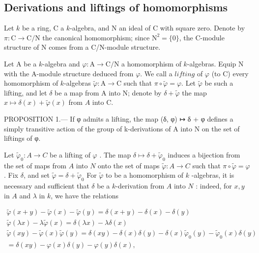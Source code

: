\subsection{Derivations and liftings of homomorphisms}

Let \(k\) be a ring, C a \(k\)-algebra, and N an ideal of C with square zero. Denote by \(\pi : \mathrm{C} \to \mathrm{C/N}\) the canonical homomorphism; since \(\mathrm{N}^2 = \{0\}\), the C-module structure of N comes from a C/N-module structure.

Let A be a \(k\)-algebra and \(\varphi : \mathrm{A} \to \mathrm{C/N}\) a homomorphism of \(k\)-algebras. Equip N with the A-module structure deduced from \(\varphi\). We call a \(lifting\) of \(\varphi\) (to C) every homomorphism of \(k\)-algebras \(\tilde{\varphi} : \mathrm{A} \to \mathrm{C}\) such that \(\pi \circ \tilde{\varphi} = \varphi\). Let \(\tilde{\varphi}\) be such a lifting, and let \(\delta\) be a map from A into N; denote by \(\delta + \tilde{\varphi}\) the map \(x \mapsto \delta(x) + \tilde{\varphi}(x)\) from \(A\) into C.

PROPOSITION 1.--- If φ admits a lifting, the map (δ, φ) ↦ δ + φ defines a simply transitive action of the group of k-derivations of A into N on the set of liftings of φ.

Let \(\tilde{\varphi}_{0}: A \to C\) be a lifting of \(\varphi\) . The map \(\delta \mapsto \delta + \tilde{\varphi}_{0}\) induces a bijection from the set of maps from \(A\) into \(N\) onto the set of maps \(\tilde{\varphi}: A \to C\) such that \(\pi \circ \tilde{\varphi} = \varphi\) . Fix \(\delta\), and set \(\tilde{\varphi} = \delta + \tilde{\varphi}_{0}\) For \(\tilde{\varphi}\) to be a homomorphism of \(k\) -algebras, it is necessary and sufficient that \(\delta\) be a \(k\)-derivation from \(A\) into \(N\) : indeed, for \(x, y\) in \(A\) and \(\lambda\) in \(k\), we have the relations

\[
\begin{array}{c} \tilde {\varphi} (x + y) - \tilde {\varphi} (x) - \tilde {\varphi} (y) = \delta (x + y) - \delta (x) - \delta (y) \\ \tilde {\varphi} (\lambda x) - \lambda \tilde {\varphi} (x) = \delta (\lambda x) - \lambda \delta (x) \\ \tilde {\varphi} (x y) - \tilde {\varphi} (x) \tilde {\varphi} (y) = \delta (x y) - \delta (x) \delta (y) - \delta (x) \tilde {\varphi} _ {0} (y) - \tilde {\varphi} _ {0} (x) \delta (y) \\ = \delta (x y) - \varphi (x) \delta (y) - \varphi (y) \delta (x), \end{array}
\]

